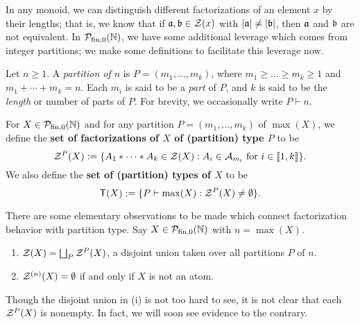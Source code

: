 
In any monoid, we can distinguish different factorizations of an element $x$ by their lengths; that is, we know that if $\aa,\bb\in \Z(x)$ with $|\aa| \neq |\bb|$, then $\aa$ and $\bb$ are not equivalent.
In $\PN$, we have some additional leverage which comes from integer partitions; we make some definitions to facilitate this leverage now.

\begin{defn}
	Let $n\ge 1$. A \textit{partition of $n$} is $P = (m_1,\dots, m_k)$, where $m_1 \ge \dots \ge m_k \ge 1$ and $m_1+\cdots + m_k = n$. 
	Each $m_i$ is said to be a \textit{part} of $P$, and $k$ is said to be the \textit{length} or number of parts of $P$.
	For brevity, we occasionally write $P \vdash n$.
	
	For $X \in \PN$ and for any partition $P = (m_1,\dots, m_k)$ of $\max(X)$, we define the \textbf{set of factorizations of $X$ of (partition) type $P$} to be
	\[ \Z^P(X) := \{ A_1*\cdots * A_k \in \Z(X) : A_i \in \mathcal{A}_{m_i} \textrm{ for } i\in \llb 1,k \rrb \}. \]
	We also define the \textbf{set of (partition) types of $X$} to be
	\[ \mathsf{T}(X) :=  \{ P \vdash \max(X) : \Z^P(X) \neq \emptyset \}. \]
\end{defn}

\begin{rk}
	There are some elementary observations to be made which connect factorization behavior with partition type.
	Say $X \in \PN$ with $n = \max(X)$.
	\begin{enumerate}[label={\rm (\roman{*})}]
		\item $\Z(X) = \bigsqcup_{P} \Z^P(X)$, a disjoint union taken over all partitions $P$ of $n$.
		\item $\Z^{(n)}(X) = \emptyset$ if and only if $X$ is not an atom.
	\end{enumerate}
	Though the disjoint union in (i) is not too hard to see, it is not clear that each $\Z^P(X)$ is nonempty.
	In fact, we will soon see evidence to the contrary.
\end{rk}



